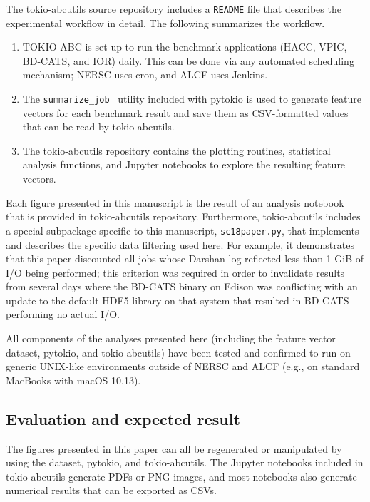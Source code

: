 The tokio-abcutils source repository includes a \texttt{README} file that describes the experimental workflow in detail.
The following summarizes the workflow.

\begin{enumerate}[leftmargin=*]

\item TOKIO-ABC is set up to run the benchmark applications (HACC, VPIC, BD-CATS, and IOR) daily.
This can be done via any automated scheduling mechanism; NERSC uses cron, and ALCF uses Jenkins.

\item The \texttt{summarize\_job}~\cite{Lockwood2018tokio} utility included with pytokio is used to generate feature vectors for each benchmark result and save them as CSV-formatted values that can be read by tokio-abcutils.

\item The tokio-abcutils repository contains the plotting routines, statistical analysis functions, and Jupyter notebooks to explore the resulting feature vectors.

\end{enumerate}

Each figure presented in this manuscript is the result of an analysis notebook that is provided in tokio-abcutils repository.
Furthermore, tokio-abcutils includes a special subpackage specific to this manuscript, \texttt{sc18paper.py}, that implements and describes the specific data filtering used here.
For example, it demonstrates that this paper discounted all jobs whose Darshan log reflected less than 1 GiB of I/O being performed; this criterion was required in order to invalidate results from several days where the BD-CATS binary on Edison was conflicting with an update to the default HDF5 library on that system that resulted in BD-CATS performing no actual I/O.

All components of the analyses presented here (including the feature vector dataset, pytokio, and tokio-abcutils) have been tested and confirmed to run on generic UNIX-like environments outside of NERSC and ALCF (e.g., on standard MacBooks with macOS 10.13).

\subsection{Evaluation and expected result}

The figures presented in this paper can all be regenerated or manipulated by using the dataset, pytokio, and tokio-abcutils.
The Jupyter notebooks included in tokio-abcutils generate PDFs or PNG images, and most notebooks also generate numerical results that can be exported as CSVs.

